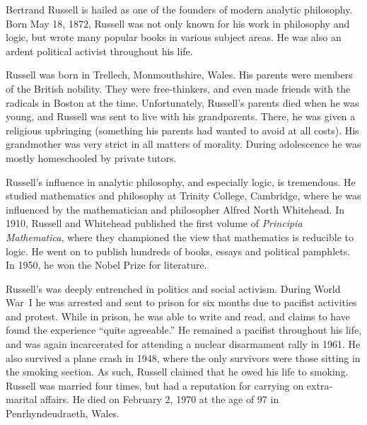 \documentclass[../../../include/open-logic-section]{subfiles}
\begin{document}



Bertrand Russell is hailed as one of the founders of modern analytic
philosophy. Born May 18, 1872, Russell was not only known for his work
in philosophy and logic, but wrote many popular books in various
subject areas. He was also an ardent political activist throughout his
life.

Russell was born in Trellech, Monmouthshire, Wales. His parents were
members of the British nobility. They were free-thinkers, and even
made friends with the radicals in Boston at the time.  Unfortunately,
Russell's parents died when he was young, and Russell was sent to live
with his grandparents. There, he was given a religious upbringing
(something his parents had wanted to avoid at all costs). His
grandmother was very strict in all matters of morality. During
adolescence he was mostly homeschooled by private tutors.

Russell's influence in analytic philosophy, and especially logic, is
tremendous. He studied mathematics and philosophy at Trinity College,
Cambridge, where he was influenced by the mathematician and
philosopher Alfred North Whitehead.  In 1910, Russell and Whitehead
published the first volume of \emph{Principia Mathematica}, where they
championed the view that mathematics is reducible to logic. He went on
to publish hundreds of books, essays and political pamphlets. In 1950,
he won the Nobel Prize for literature.

Russell's was deeply entrenched in politics and social
activism. During World War~I he was arrested and sent to prison for
six months due to pacifist activities and protest. While in prison, he
was able to write and read, and claims to have found the experience
``quite agreeable.'' He remained a pacifist throughout his life, and
was again incarcerated for attending a nuclear disarmament rally in
1961. He also survived a plane crash in 1948, where the only survivors
were those sitting in the smoking section. As such, Russell claimed
that he owed his life to smoking. Russell was married four times, but
had a reputation for carrying on extra-marital affairs.  He died on
February 2, 1970 at the age of 97 in Penrhyndeudraeth, Wales.
\end{document}
